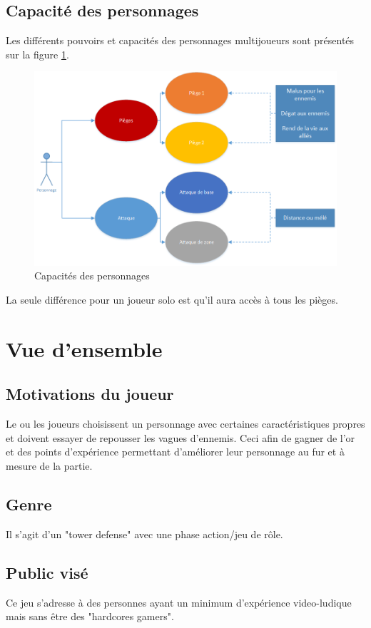 \documentclass[12pt]{article}
\begin{document}
\subsection{Capacité des personnages}
Les différents pouvoirs et capacités des personnages multijoueurs sont présentés sur la figure \ref{Capacite des personnages}.
\begin{figure}[h]
\begin{center}
\includegraphics[scale=0.7]{capacite.png} 
\end{center}
\caption{Capacités des personnages}
\label{Capacite des personnages}
\end{figure}
La seule différence pour un joueur solo est qu'il aura accès à tous les pièges.

\pagebreak
\section{Vue d'ensemble}
\subsection{Motivations du joueur}
Le ou les joueurs choisissent un personnage avec certaines caractéristiques propres et doivent essayer de repousser les vagues d'ennemis. Ceci afin de gagner de l'or et des points d'expérience permettant d'améliorer leur personnage au fur et à mesure de la partie.
\subsection{Genre}
Il s'agit d'un "tower defense" avec une phase action/jeu de rôle.
\subsection{Public visé}
Ce jeu s'adresse à des personnes ayant un minimum d'expérience video-ludique mais sans être des "hardcores gamers".
\end{document}
